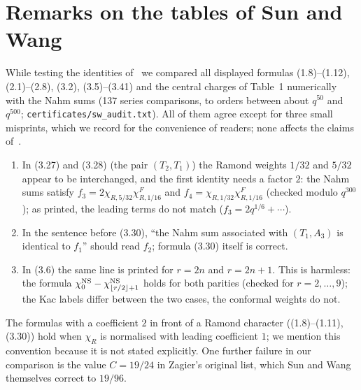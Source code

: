 \documentclass[11pt]{amsart}
\theoremstyle{definition}
\numberwithin{equation}{section}
\newcommand{\fpath}[1]{\nolinkurl{#1}}
\begin{document}
\appendix
\section{Remarks on the tables of Sun and Wang}\label{app:SW}

While testing the identities of~\cite{SW} we compared all displayed formulas (1.8)--(1.12), (2.1)--(2.8),
(3.2), (3.5)--(3.41) and the central charges of Table~1 numerically with the Nahm sums (137 series
comparisons, to orders between about $q^{50}$ and $q^{500}$; \fpath{certificates/sw_audit.txt}). All of them
agree except for three small misprints, which we record for the convenience of readers; none affects the
claims of~\cite{SW}.
\begin{enumerate}[leftmargin=2em]
\item In (3.27) and (3.28) (the pair $(T_2,T_1)$) the Ramond weights $1/32$ and $5/32$ appear to be
interchanged, and the first identity needs a factor $2$: the Nahm sums satisfy
$f_3=2\chi_{R,5/32}\chi^F_{R,1/16}$ and $f_4=\chi_{R,1/32}\chi^F_{R,1/16}$ (checked modulo $q^{300}$); as printed,
the leading terms do not match ($f_3=2q^{1/6}+\cdots$).
\item In the sentence before (3.30), ``the Nahm sum associated with $(T_1,A_3)$ is identical to $f_1$''
should read $f_2$; formula (3.30) itself is correct.
\item In (3.6) the same line is printed for $r=2n$ and $r=2n+1$. This is harmless: the formula
$\chi^{\rm NS}_0-\chi^{\rm NS}_{\lfloor r/2\rfloor+1}$ holds for both parities (checked for $r=2,\dots,9$); the Kac
labels differ between the two cases, the conformal weights do not.
\end{enumerate}
The formulas with a coefficient $2$ in front of a Ramond character ((1.8)--(1.11), (3.30)) hold when
$\chi_R$ is normalised with leading coefficient $1$; we mention this convention because it is not stated
explicitly. One further failure in our comparison is the value $C=19/24$ in Zagier's original list, which
Sun and Wang themselves correct to $19/96$.
\end{document}
